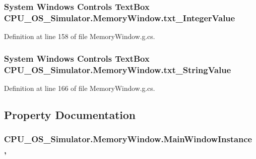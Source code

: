 \subsubsection[{txt\+\_\+\+Integer\+Value}]{\setlength{\rightskip}{0pt plus 5cm}System Windows Controls Text\+Box C\+P\+U\+\_\+\+O\+S\+\_\+\+Simulator.\+Memory\+Window.\+txt\+\_\+\+Integer\+Value\hspace{0.3cm}{\ttfamily [package]}}\label{class_c_p_u___o_s___simulator_1_1_memory_window_af1ad9478de6dac0b4476c51b42849ecf}


Definition at line 158 of file Memory\+Window.\+g.\+cs.

\hypertarget{class_c_p_u___o_s___simulator_1_1_memory_window_aca8e57432af036b698d0eeaaa765c483}{}
\subsubsection[{txt\+\_\+\+String\+Value}]{\setlength{\rightskip}{0pt plus 5cm}System Windows Controls Text\+Box C\+P\+U\+\_\+\+O\+S\+\_\+\+Simulator.\+Memory\+Window.\+txt\+\_\+\+String\+Value\hspace{0.3cm}{\ttfamily [package]}}\label{class_c_p_u___o_s___simulator_1_1_memory_window_aca8e57432af036b698d0eeaaa765c483}


Definition at line 166 of file Memory\+Window.\+g.\+cs.



\subsection{Property Documentation}
\hypertarget{class_c_p_u___o_s___simulator_1_1_memory_window_aaa625aed8c7670aed16f9ab0f9e5e080}{}
\subsubsection[{Main\+Window\+Instance}]{ C\+P\+U\+\_\+\+O\+S\+\_\+\+Simulator.\+Memory\+Window.\+Main\+Window\+Instance\hspace{0.3cm}{\ttfamily [get]}, {\ttfamily [set]}}\label{class_c_p_u___o_s___simulator_1_1_memory_window_aaa625aed8c7670aed16f9ab0f9e5e080}


